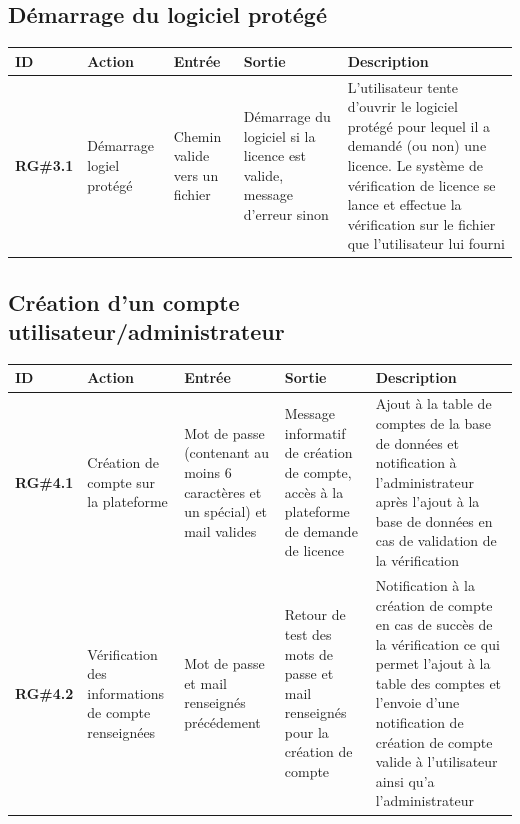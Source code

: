 \subsection{Démarrage du logiciel protégé}

\begin{table}[!h] %
    \small
    \begin{tabular}{|m{1.5cm}|m{1.9cm}|m{2.5cm}|m{2.5cm}|m{7cm}|} 
	\hline
	    \textbf{ID} & \textbf{Action} & \textbf{Entrée} & \textbf{Sortie} & \textbf{Description} \\
	\hline
	    \textbf{RG\#3.1} & Démarrage logiel protégé & Chemin valide vers un fichier & Démarrage du logiciel si la licence est valide, message d'erreur sinon & L'utilisateur tente d'ouvrir le logiciel protégé pour lequel il a demandé (ou non) une licence. Le système de vérification de licence se lance et effectue la vérification sur le fichier que l'utilisateur lui fourni \\
    \hline
    \end{tabular}
\end{table}
	
\subsection{Création d'un compte utilisateur/administrateur}

\begin{table}[!h] %
    \small
    \begin{tabular}{|m{1.5cm}|m{1.9cm}|m{2.5cm}|m{2.5cm}|m{7cm}|} 
	\hline
	    \textbf{ID} & \textbf{Action} & \textbf{Entrée} & \textbf{Sortie} & \textbf{Description} \\
	\hline
	    \textbf{RG\#4.1} & Création de compte sur la  plateforme & Mot de passe (contenant au moins 6 caractères et un spécial) et mail valides & Message informatif de création de compte, accès à la plateforme de demande de licence& Ajout à la table de comptes de la base de données et notification à l'administrateur après l'ajout à la base de données en cas de validation de la vérification\\
	\hline
	    \textbf{RG\#4.2} & Vérification des informations de  compte renseignées & Mot de passe et mail renseignés précédement & Retour de test des mots de passe et mail renseignés pour la création de compte& Notification à la création de compte en cas de succès de la vérification ce qui permet l'ajout à la table des comptes et l'envoie d'une notification de création de compte valide à l'utilisateur ainsi qu'a l'administrateur\\
	\hline
    \end{tabular}
\end{table}

